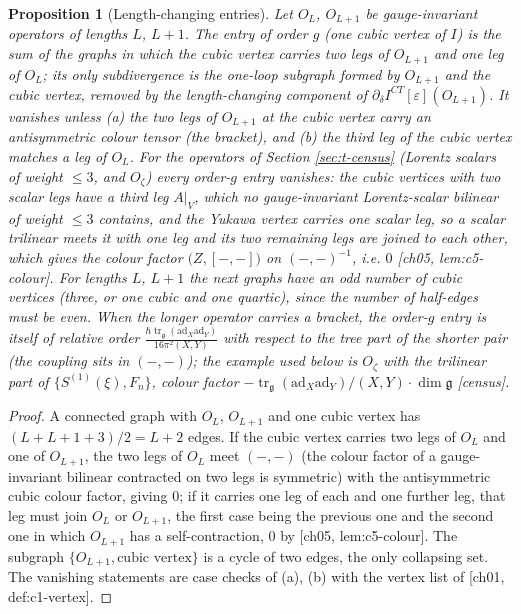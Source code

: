 \documentclass[11pt]{report}
\theoremstyle{plain}
\newtheorem{proposition}[theorem]{Proposition}
\theoremstyle{definition}
\numberwithin{equation}{chapter}
\newcommand{\unit}{\tfrac{\hbar\operatorname{tr}_{\mathfrak g}(\mathrm{ad}_X\mathrm{ad}_Y)}{16\pi^2(X,Y)}}
\begin{document}
\begin{proposition}[Length-changing entries]
\label{prop:t-orderg}
Let $O_{L}$, $O_{L+1}$ be gauge-invariant operators of lengths $L$, $L+1$. The entry of order $g$ (one cubic vertex of $I$) is the sum of the graphs in which the cubic vertex carries two legs of $O_{L+1}$ and one leg of $O_L$; its only subdivergence is the one-loop subgraph formed by $O_{L+1}$ and the cubic vertex, removed by the length-changing component of $\partial_\delta I^{CT}[\varepsilon](O_{L+1})$. It vanishes unless (a) the two legs of $O_{L+1}$ at the cubic vertex carry an antisymmetric colour tensor (the bracket), and (b) the third leg of the cubic vertex matches a leg of $O_L$. For the operators of Section \ref{sec:t-census} (Lorentz scalars of weight $\le3$, and $O_\zeta$) every order-$g$ entry vanishes: the cubic vertices with two scalar legs have a third leg $A|_V$, which no gauge-invariant Lorentz-scalar bilinear of weight $\le3$ contains, and the Yukawa vertex carries one scalar leg, so a scalar trilinear meets it with one leg and its two remaining legs are joined to each other, which gives the colour factor $\big(Z,[-,-]\big)$ on $(-,-)^{-1}$, i.e. $0$ [ch05, lem:c5-colour]. For lengths $L$, $L+1$ the next graphs have an odd number of cubic vertices (three, or one cubic and one quartic), since the number of half-edges must be even. When the longer operator carries a bracket, the order-$g$ entry is itself of relative order $\unit$ with respect to the tree part of the shorter pair (the coupling sits in $(-,-)$); the example used below is $O_\zeta$ with the trilinear part of $\{S^{(1)}(\xi),F_n\}$, colour factor $-\operatorname{tr}_{\mathfrak g}(\mathrm{ad}_X\mathrm{ad}_Y)/(X,Y)\cdot\dim\mathfrak g$ [census].
\end{proposition}

\begin{proof}
A connected graph with $O_L$, $O_{L+1}$ and one cubic vertex has $(L+L+1+3)/2=L+2$ edges. If the cubic vertex carries two legs of $O_L$ and one of $O_{L+1}$, the two legs of $O_L$ meet $(-,-)$ (the colour factor of a gauge-invariant bilinear contracted on two legs is symmetric) with the antisymmetric cubic colour factor, giving $0$; if it carries one leg of each and one further leg, that leg must join $O_L$ or $O_{L+1}$, the first case being the previous one and the second one in which $O_{L+1}$ has a self-contraction, $0$ by [ch05, lem:c5-colour]. The subgraph $\{O_{L+1},\text{cubic vertex}\}$ is a cycle of two edges, the only collapsing set. The vanishing statements are case checks of (a), (b) with the vertex list of [ch01, def:c1-vertex].
\end{proof}
\end{document}

